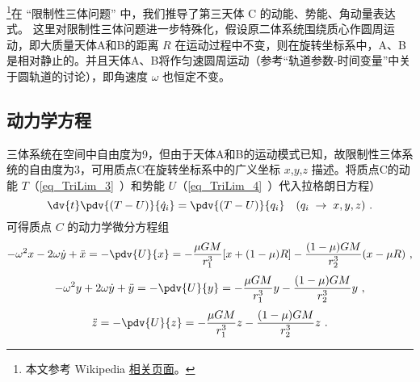 
\begin{issues}
\issueNeedCite
\end{issues}


\footnote{本文参考 Wikipedia \href{https://en.wikipedia.org/wiki/Jacobi_integral}{相关页面}。}在 “限制性三体问题” 中，我们推导了第三天体 C 的动能、势能、角动量表达式。 这里对限制性三体问题进一步特殊化，假设原二体系统围绕质心作圆周运动，即大质量天体A和B的距离 $R$ 在运动过程中不变，则在旋转坐标系中，A、B是相对静止的。并且天体A、B将作匀速圆周运动（参考“轨道参数-时间变量”中关于圆轨道的讨论），即角速度 $\omega$ 也恒定不变。


\subsection{动力学方程}
三体系统在空间中自由度为9，但由于天体A和B的运动模式已知，故限制性三体系统的自由度为3，可用质点C在旋转坐标系中的广义坐标 $x$,$y$,$z$ 描述。将质点C的动能 $T$（\autoref{eq_TriLim_3}~）和势能 $U$（\autoref{eq_TriLim_4}~）代入拉格朗日方程）
\begin{equation}%
\dv{t} \pdv{(T-U)}{\dot q_i} = \pdv{(T-U)}{q_i}
\quad (q_i\; \rightarrow \; x,y,z)~.
\end{equation}
可得质点 $C$ 的动力学微分方程组
\begin{equation}\label{eq_JConst_2}
-\omega^2 x - 2\omega\dot{y} + \ddot{x} =- \pdv{U}{x}=-\frac{\mu GM}{r_1^3}[x+(1-\mu)R]-\frac{(1-\mu)GM}{r_2^3}(x-\mu R)~,
\end{equation}
\begin{equation}\label{eq_JConst_3}
-\omega^2 y +2\omega\dot{y} + \ddot{y} =- \pdv{U}{y}=-\frac{\mu GM}{r_1^3}y-\frac{(1-\mu)GM}{r_2^3}y~,
\end{equation}
\begin{equation}\label{eq_JConst_4}
\ddot{z} =- \pdv{U}{z} =-\frac{\mu GM}{r_1^3}z-\frac{(1-\mu)GM}{r_2^3}z~.
\end{equation}

